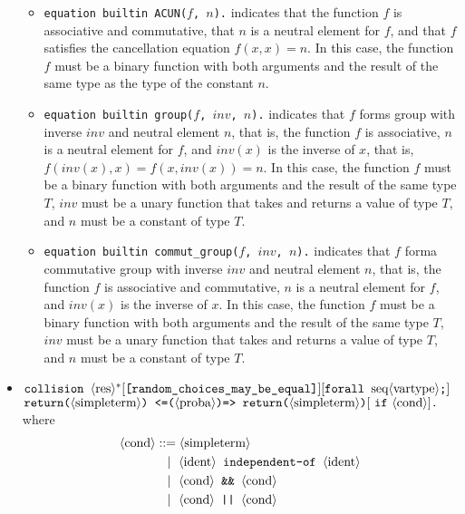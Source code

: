 \begin{itemize}
\begin{itemize}
\item \texttt{equation builtin ACUN($f$, $n$).} indicates that the function $f$ is associative and commutative, that $n$ is a neutral element for $f$, and that $f$ satisfies the cancellation equation $f(x,x) = n$. In this case, the function $f$ must be a binary function with both arguments and the result of the same type as the type of the constant $n$.

\item \texttt{equation builtin group($f$, $inv$, $n$).} indicates that $f$ forms group with inverse $inv$ and neutral element $n$, that is, the function $f$ is associative, $n$ is a neutral element for $f$, and $inv(x)$ is the inverse of $x$, that is, $f(inv(x),x) = f(x,inv(x)) = n$. In this case, the function $f$ must be a binary function with both arguments and the result of the same type $T$, $inv$ must be a unary function that takes and returns a value of type $T$, and $n$ must be a constant of type $T$.

\item \texttt{equation builtin commut\_group($f$, $inv$, $n$).} indicates that $f$ forma commutative group with inverse $inv$ and neutral element $n$, that is, the function $f$ is associative and commutative, $n$ is a neutral element for $f$, and $inv(x)$ is the inverse of $x$. In this case, the function $f$ must be a binary function with both arguments and the result of the same type $T$, $inv$ must be a unary function that takes and returns a value of type $T$, and $n$ must be a constant of type $T$.

\end{itemize}

\item 
$\texttt{collision }\langle\textrm{res}\rangle^*
[\texttt{[random\_choices\_may\_be\_equal]}]
[\texttt{forall }\textrm{seq}\langle\textrm{vartype}\rangle\texttt{;}]$\\
\null\qquad $\texttt{return(}\langle\textrm{simpleterm}\rangle\texttt{) <=(}\langle\textrm{proba}\rangle\texttt{)=> return(}\langle\textrm{simpleterm}\rangle\texttt{)}
[\ \texttt{if}\ \langle\textrm{cond}\rangle]\texttt{.}$\\
where
\begin{align*}
\langle\textrm{cond}\rangle &::= \langle\textrm{simpleterm}\rangle\\
&\ \ \mid \ \langle\textrm{ident}\rangle\texttt{ independent-of }\langle\textrm{ident}\rangle\\
&\ \ \mid \ \langle\textrm{cond}\rangle\texttt{ \&\& }\langle\textrm{cond}\rangle\\
&\ \ \mid \ \langle\textrm{cond}\rangle\texttt{ || }\langle\textrm{cond}\rangle
\end{align*}


\end{itemize}
